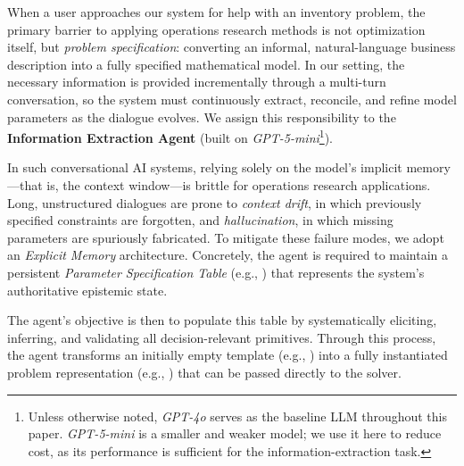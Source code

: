 \documentclass[mnsc,nonblindrev]{informs3_hide}
\begin{document}
    

    When a user approaches our system for help with an inventory problem, the primary barrier to applying operations research methods is not optimization itself, but \emph{problem specification}: converting an informal, natural-language business description into a fully specified mathematical model. In our setting, the necessary information is provided incrementally through a multi-turn conversation, so the system must continuously extract, reconcile, and refine model parameters as the dialogue evolves. We assign this responsibility to the \textbf{Information Extraction Agent} (built on \emph{GPT-5-mini}\footnote{Unless otherwise noted, \emph{GPT-4o} serves as the baseline LLM throughout this paper. \emph{GPT-5-mini} is a smaller and weaker model; we use it here to reduce cost, as its performance is sufficient for the information-extraction task.}).

    In such conversational AI systems, relying solely on the model’s implicit memory---that is, the context window---is brittle for operations research applications. Long, unstructured dialogues are prone to \emph{context drift}, in which previously specified constraints are forgotten, and \emph{hallucination}, in which missing parameters are spuriously fabricated. To mitigate these failure modes, we adopt an \emph{Explicit Memory} architecture. Concretely, the agent is required to maintain a persistent \emph{Parameter Specification Table} (e.g., ) that represents the system’s authoritative epistemic state.
    
    The agent’s objective is then to populate this table by systematically eliciting, inferring, and validating all decision-relevant primitives. Through this process, the agent transforms an initially empty template (e.g., ) into a fully instantiated problem representation (e.g., ) that can be passed directly to the solver.
    
\end{document}
